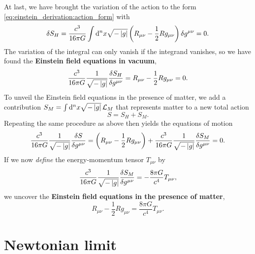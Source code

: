 At last, we have brought the variation of the action to the form \eqref{eq:einstein_derivation:action_form} with
\begin{equation}
	\delta S_H = \frac{c^3}{16 \pi G} \int \mathop{}\!\mathrm{d}^n x \sqrt{-\left\lvert g \right\rvert} \left( R_{\mu \nu} - \frac{1}{2} R g_{\mu \nu} \right) \delta g^{\mu \nu} = 0 .
\end{equation}
The variation of the integral can only vanish if the integrand vanishes, so we have found the \textbf{Einstein field equations in vacuum},
\begin{equation}
	 \frac{c^3}{16 \pi G} \frac{1}{\sqrt{-\det{g}}} \fdv{S_H}{g^{\mu \nu}} = R_{\mu \nu} - \frac{1}{2} R g_{\mu \nu} = 0 .
	\label{eq:einstein_derivation:einstein_vacuum}
\end{equation}
To unveil the Einstein field equations in the presence of matter, we add a contribution $S_M = \int \mathop{}\!\mathrm{d}^n x \sqrt{-\left\lvert g \right\rvert} \, \mathcal{L}_M$ that represents matter to a new total action
\begin{equation}
	S = S_H + S_M .
\end{equation}
Repeating the same procedure as above then yields the equations of motion
\begin{equation}
	\frac{c^3}{16 \pi G} \frac{1}{\sqrt{-\det{g}}} \fdv{S}{g^{\mu \nu}} = \left( R_{\mu \nu} - \frac{1}{2} R g_{\mu \nu} \right) + \frac{c^3}{16 \pi G} \frac{1}{\sqrt{-\det{g}}} \frac{\variation{S_M}}{\variation{g^{\mu \nu}}} = 0 .
\end{equation}
If we now \emph{define} the energy-momentum tensor $T_{\mu \nu}$ by
\begin{equation}
	\frac{c^3}{16 \pi G} \frac{1}{\sqrt{-\left\lvert g \right\rvert}} \frac{\delta S_M}{\delta g^{\mu \nu}} = -\frac{8 \pi G}{c^4} T_{\mu \nu} ,
\end{equation}
we uncover the \textbf{Einstein field equations in the presence of matter},
\begin{equation}
	R_{\mu \nu} - \frac{1}{2} R g_{\mu \nu} = \frac{8 \pi G}{c^4} T_{\mu \nu} .
	\label{eq:einstein_derivation:einstein_matter}
\end{equation}

\section{Newtonian limit}
\label{sec:weak_field_limit}


